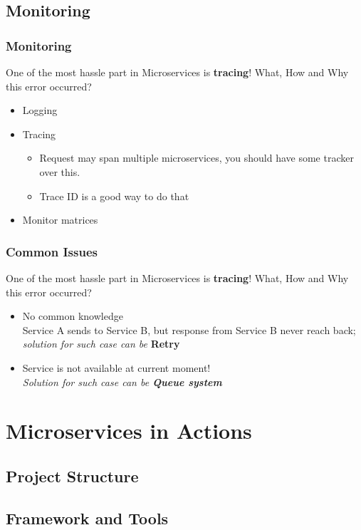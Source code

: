 \documentclass{beamer}
\begin{document}
	\subsection {Monitoring}
		\begin{frame}
			\frametitle{Monitoring}
				One of the most hassle part in Microservices is \textbf{tracing}! What, How and Why this error occurred? 
				\begin{itemize}
					\item Logging 
					\item Tracing
						\begin{itemize}
							\item \scriptsize{Request may span multiple microservices, you should have some tracker over this.}
							\item \scriptsize{Trace ID is a good way to do that}
						\end{itemize}
					\item Monitor matrices 
				\end{itemize}
			\vspace{100mm}
		\end{frame}
	
	\begin{frame}
		\frametitle{Common Issues}
		One of the most hassle part in Microservices is \textbf{tracing}! What, How and Why this error occurred? 
		\begin{itemize}
			\item No common knowledge \\
			Service A sends to Service B, but response from Service B never reach back; \textit{solution for such case can be} \textbf{Retry}
			\item Service is not available at current moment! \\
			\textit{Solution for such case can be \textbf{Queue system}}
		\end{itemize}
		\vspace{100mm}
	\end{frame}
	
		


\section{Microservices in Actions}
	\subsection {Project Structure}
	\subsection {Framework and Tools}
	
\end{document}

